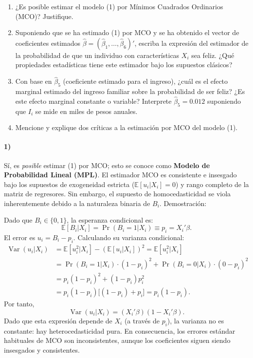 \documentclass[12pt]{article}
\begin{document}
\begin{enumerate}
\item[1.] ¿Es posible estimar el modelo (1) por Mínimos Cuadrados Ordinarios (MCO)? Justifique.
\item[2.] Suponiendo que se ha estimado (1) por MCO y se ha obtenido el vector de coeficientes estimados \(\hat{\beta} = (\hat{\beta}_1, \ldots, \hat{\beta}_6)'\), escriba la expresión del estimador de la probabilidad de que un individuo con características \(X_i\) sea feliz. ¿Qué propiedades estadísticas tiene este estimador bajo los supuestos clásicos?
\item[3.] Con base en \(\hat{\beta}_5\) (coeficiente estimado para el ingreso), ¿cuál es el efecto marginal estimado del ingreso familiar sobre la probabilidad de ser feliz? ¿Es este efecto marginal constante o variable? Interprete \(\hat{\beta}_5 = 0.012\) suponiendo que \(I_i\) se mide en miles de pesos anuales.
\item[4.] Mencione y explique dos críticas a la estimación por MCO del modelo (1). 
\end{enumerate}

\bigskip
\bigskip

\paragraph{1)} 
Sí, es \textit{posible} estimar (1) por MCO; esto se conoce como \textbf{Modelo de Probabilidad Lineal (MPL)}. El estimador MCO es consistente e insesgado bajo los supuestos de exogeneidad estricta (\(\mathbb{E}[u_i|X_i]=0\)) y rango completo de la matriz de regresores. Sin embargo, el supuesto de homocedasticidad se viola inherentemente debido a la naturaleza binaria de \(B_i\). Demostración:

Dado que \(B_i\in\{0,1\}\), la esperanza condicional es:
\[
\mathbb{E}[B_i|X_i] = \Pr(B_i=1|X_i) \equiv p_i = X_i'\beta.
\]
El error es \(u_i = B_i - p_i\). Calculando su varianza condicional:
\[
\begin{aligned}
\operatorname{Var}(u_i|X_i) &= \mathbb{E}[u_i^2|X_i] - (\mathbb{E}[u_i|X_i])^2 = \mathbb{E}[u_i^2|X_i] \\
&= \Pr(B_i=1|X_i)\cdot(1-p_i)^2 + \Pr(B_i=0|X_i)\cdot(0-p_i)^2 \\
&= p_i(1-p_i)^2 + (1-p_i)p_i^2 \\
&= p_i(1-p_i)\big[(1-p_i)+p_i\big] = p_i(1-p_i).
\end{aligned}
\]
Por tanto,
\[
\operatorname{Var}(u_i|X_i) = (X_i'\beta)(1 - X_i'\beta).
\]
Dado que esta expresión depende de \(X_i\) (a través de \(p_i\)), la varianza no es constante: hay heterocedasticidad pura. En consecuencia, los errores estándar habituales de MCO son inconsistentes, aunque los coeficientes siguen siendo insesgados y consistentes.
\end{document}
